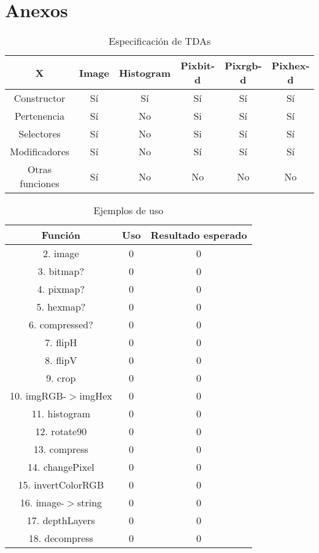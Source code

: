 \section*{Anexos}

\begin{table}[H]
    \begin{center}
    \begin{tabular}{| c | c | c | c | c | c | }
    \hline
    X & Image & Histogram & Pixbit-d & Pixrgb-d & Pixhex-d \\ \hline
    Constructor & Sí & Sí & Sí & Sí & Sí \\
    Pertenencia & Sí & No & Si & Sí & Sí \\
    Selectores & Sí & No & Si & Sí & Sí \\
    Modificadores & Sí & No & Sí & Sí & Sí \\
    Otras funciones & Sí & No & No & No & No \\ \hline
    \end{tabular}
    \caption{Especificación de TDAs}
    \label{tab:TDAs}
    \end{center}
\end{table}


\begin{table}[H]
    \begin{center}
    \begin{tabular}{|c|c|c|}
    \hline
    Función & Uso & Resultado esperado \\ \hline
    2. image & 0 & 0 \\ \hline
    3. bitmap? & 0 & 0 \\ \hline
    4. pixmap? & 0 & 0 \\ \hline
    5. hexmap? & 0 & 0 \\ \hline
    6. compressed? & 0 & 0 \\ \hline
    7. flipH & 0 & 0 \\ \hline
    8. flipV & 0 & 0 \\ \hline
    9. crop & 0 & 0 \\ \hline
    10. imgRGB-$>$imgHex & 0 &  0 \\ \hline
    11. histogram & 0 & 0 \\ \hline
    12. rotate90 & 0 & 0 \\ \hline
    13. compress & 0 & 0 \\ \hline
    14. changePixel & 0 & 0 \\ \hline
    15. invertColorRGB & 0 & 0 \\ \hline
    16. image-$>$string & 0 & 0 \\ \hline
    17. depthLayers & 0 & 0 \\  \hline
    18. decompress & 0 & 0 \\ \hline
    \end{tabular}
    \caption{Ejemplos de uso}
    \label{tab:Ejemplos}
    \end{center}
\end{table}


